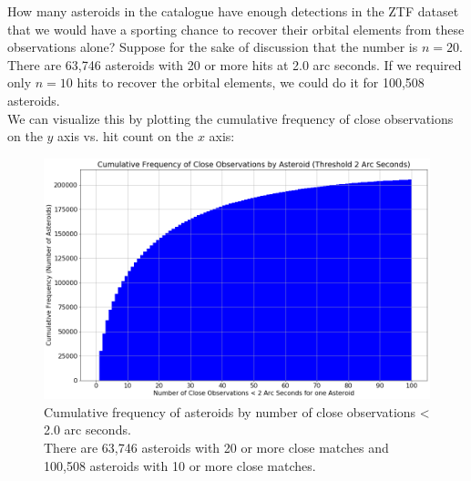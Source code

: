 How many asteroids in the catalogue have enough detections in the ZTF dataset that we would have 
a sporting chance to recover their orbital elements from these observations alone?
Suppose for the sake of discussion that the number is $n=20$.
There are 63,746 asteroids with 20 or more hits at 2.0 arc seconds.
If we required only $n=10$ hits to recover the orbital elements, we could do it for 100,508 asteroids.\\
We can visualize this by plotting the cumulative frequency of close observations on the $y$ axis vs. hit count on the $x$ axis:
\begin{figure}[hbt!]
\begin{center}
\includegraphics[width=1.0\textwidth]{../figs/ztf/nearest_ast_cum.png}
\caption{Cumulative frequency of asteroids by number of close observations < 2.0 arc seconds. \\
There are 63,746 asteroids with 20 or more close matches and 100,508 asteroids with 10 or more close matches. }
\end{center}
\end{figure}
\clearpage

